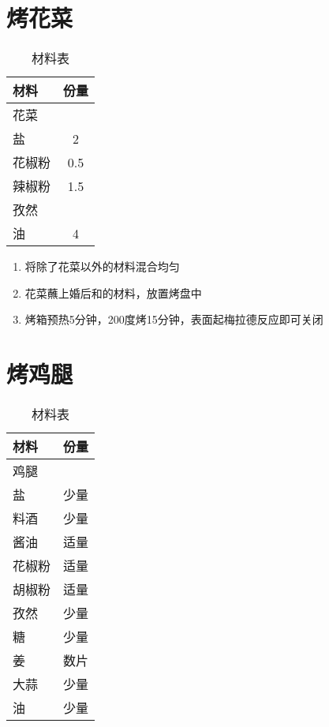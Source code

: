 \section{烤花菜}

\begin{table}[H]
    \centering
    \begin{tabular}{|l||c|}\hline
     \textbf{材料}    &  \textbf{份量}\\ \hline\hline
    花菜    &   \\ \hline
    盐    &  2 \\ \hline
    花椒粉    & 0.5 \\ \hline
    辣椒粉    & 1.5 \\ \hline
    孜然    &  \\ \hline
    油    &  4 \\ \hline
    \end{tabular}
    \caption{材料表}
\end{table}

\begin{enumerate}
    \item 将除了花菜以外的材料混合均匀
    \item 花菜蘸上婚后和的材料，放置烤盘中
    \item 烤箱预热5分钟，200度烤15分钟，表面起梅拉德反应即可关闭
\end{enumerate}



\section{烤鸡腿}

\begin{table}[H]
    \centering
    \begin{tabular}{|l||c|}\hline
     \textbf{材料}    &  \textbf{份量}\\ \hline\hline
    鸡腿    &   \\ \hline
    盐    &  少量 \\ \hline
    料酒    & 少量 \\ \hline
    酱油    & 适量 \\ \hline
    花椒粉    & 适量 \\ \hline
    胡椒粉    & 适量 \\ \hline
    孜然    & 少量 \\ \hline
    糖    & 少量 \\ \hline
    姜    & 数片 \\ \hline
    大蒜    & 少量 \\ \hline
    油    &  少量 \\ \hline
    \end{tabular}
    \caption{材料表}
\end{table}

